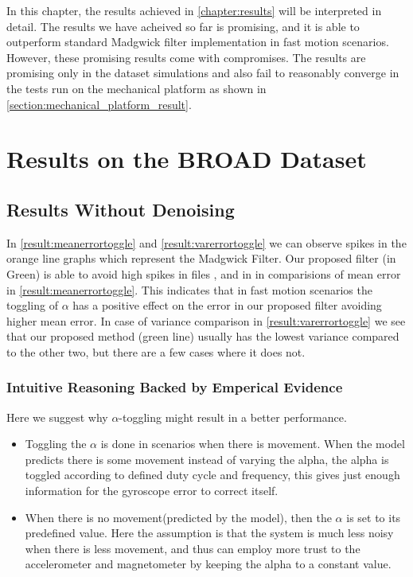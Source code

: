 \documentclass{iutbscthesis}
\begin{document}
In this chapter, the results achieved in \autoref{chapter:results} will be interpreted in detail. The results we have acheived so far is promising, and it is able to outperform standard Madgwick filter implementation in fast motion scenarios. However, these promising results come with compromises. The results are promising only in the dataset simulations and also fail 
to reasonably converge in the tests run on the mechanical platform as shown in \autoref{section:mechanical_platform_result}. 

\section{Results on the BROAD Dataset}
\subsection{Results Without Denoising}
In \autoref{result:meanerrortoggle} and \autoref{result:varerrortoggle} we can observe spikes in the orange line graphs
which represent the Madgwick Filter. Our proposed filter (in Green) is able to avoid high spikes in files ,  and in  
in comparisions of mean error in \autoref{result:meanerrortoggle}. This indicates that in fast motion scenarios the toggling of $\alpha$ 
has a positive effect on the error in our proposed filter avoiding higher mean error. In case of variance comparison
in \autoref{result:varerrortoggle} we see that our proposed method (green line) usually has the lowest variance compared to the other two, but there are a few cases where it does not.

\subsubsection{Intuitive Reasoning Backed by Emperical Evidence}
Here we suggest why $\alpha$-toggling might result in a better performance.
\begin{itemize}
    \item Toggling the $\alpha$ is done in scenarios when there is movement. When the model predicts there is some movement 
    instead of varying the alpha, the alpha is toggled according to defined duty cycle and frequency, this gives just enough information for the gyroscope error to correct itself.
    \item When there is no movement(predicted by the model), then the $\alpha$ is set to its predefined value. Here the assumption is that the system is much less noisy when there is less movement, and thus can employ more trust to the accelerometer and magnetometer by keeping the alpha to a constant value.
\end{itemize}
\end{document}
